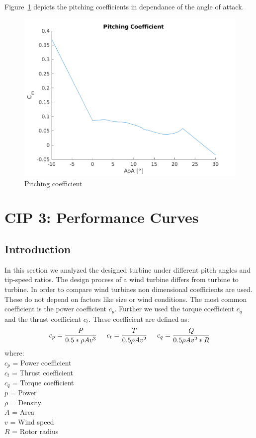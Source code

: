 \documentclass[10pt]{article}
\begin{document}
Figure~\ref{fig:pitchingcoeffs} depicts the pitching coefficients in dependance of the angle of attack.
\begin{figure}[H]
\centering
\includegraphics[width=0.8\linewidth]{../CIP_2/Figures/pitchingcoeff.png}
\caption{Pitching coefficient}
\label{fig:pitchingcoeffs}
\end{figure}


\newpage
\section{CIP 3: Performance Curves}
\subsection{Introduction}
In this section we analyzed the designed turbine under different pitch angles and tip-speed ratios. The design process of a wind turbine differs from turbine to turbine. In order to compare wind turbines non dimensional coefficients are used. These do not depend on factors like size or wind conditions. The most common coefficient is the power coefficient $c_p$. Further we used the torque coefficient $c_q$ and the thrust coefficient $c_t$.
These coefficient are defined as:
\begin{align*}
c_p = \frac{P}{0.5 *\rho A v^3}\hspace{0.5cm}c_t =  \frac{T}{0.5\rho A v^2}\hspace{0.5cm}c_q = \frac{Q}{0.5\rho A v^2*R}\\
\end{align*}
where:\\
$c_p$ = Power coefficient\\
$c_t$ = Thrust coefficient\\
$c_q$ = Torque coefficient\\
$p$   = Power\\
$\rho$ = Density\\
$A$    = Area\\
$v$	   = Wind speed\\
$R$		= Rotor radius
\end{document}
